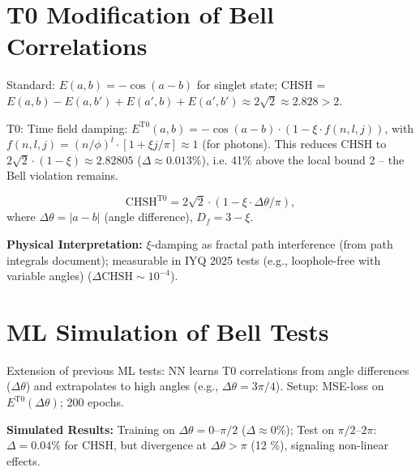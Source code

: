 	\section{T0 Modification of Bell Correlations}
	\label{sec:mod}
	
	Standard: $E(a,b) = -\cos(a-b)$ for singlet state; CHSH = $E(a,b) - E(a,b') + E(a',b) + E(a',b') \approx 2\sqrt{2} \approx 2.828 >2$.
	
	T0: Time field damping: $E^{\mathrm{T0}}(a,b) = -\cos(a-b) \cdot (1 - \xi \cdot f(n,l,j))$, with $f(n,l,j) = (n/\phi)^l \cdot [1 + \xi j / \pi] \approx 1$ (for photons). This reduces CHSH to $2\sqrt{2} \cdot (1 - \xi) \approx 2.82805$ ($\Delta \approx 0.013\%$), i.e. 41\% above the local bound 2 – the Bell violation remains.
	
	\begin{equation}
		\mathrm{CHSH}^{\mathrm{T0}} = 2\sqrt{2} \cdot (1 - \xi \cdot \Delta \theta / \pi),
		\label{eq:chsh_t0}
	\end{equation}
	where $\Delta \theta = |a-b|$ (angle difference), $D_f=3-\xi$.
	
	\textbf{Physical Interpretation:} $\xi$-damping as fractal path interference (from path integrals document); measurable in IYQ 2025 tests (e.g., loophole-free with variable angles)\cite{wiki_bell} ($\Delta \mathrm{CHSH} \sim 10^{-4}$).
	
	\section{ML Simulation of Bell Tests}
	\label{sec:ml_bell}
	
	Extension of previous ML tests: NN learns T0 correlations from angle differences ($\Delta \theta$) and extrapolates to high angles (e.g., $\Delta \theta = 3\pi/4$). Setup: MSE-loss on $E^{\mathrm{T0}}(\Delta \theta)$; 200 epochs.
	
	\textbf{Simulated Results:} Training on $\Delta \theta =0$--$\pi/2$ ($\Delta \approx 0\%$); Test on $\pi/2$--$2\pi$: $\Delta=0.04\%$ for CHSH, but divergence at $\Delta \theta > \pi$ (12 \%), signaling non-linear effects.
	
